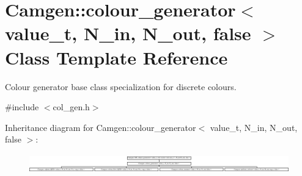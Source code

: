 \hypertarget{a00083}{\section{Camgen\-:\-:colour\-\_\-generator$<$ value\-\_\-t, N\-\_\-in, N\-\_\-out, false $>$ Class Template Reference}
\label{a00083}
}


Colour generator base class specialization for discrete colours.  




{\ttfamily \#include $<$col\-\_\-gen.\-h$>$}

Inheritance diagram for Camgen\-:\-:colour\-\_\-generator$<$ value\-\_\-t, N\-\_\-in, N\-\_\-out, false $>$\-:\begin{figure}[H]
\begin{center}
\leavevmode
\includegraphics[height=0.821918cm]{a00083}
\end{center}
\end{figure}
